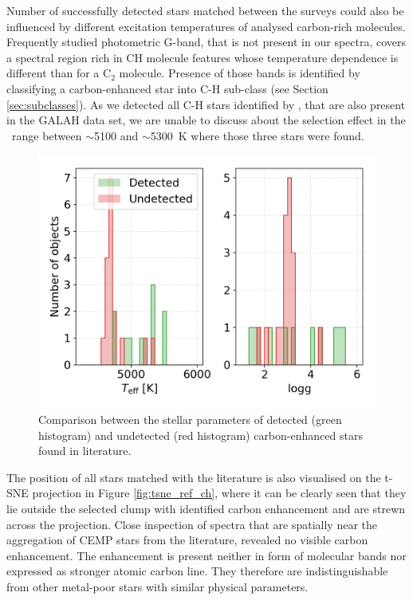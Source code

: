 Number of successfully detected stars matched between the surveys could also be influenced by different excitation temperatures of analysed carbon-rich molecules. Frequently studied photometric G-band, that is not present in our spectra, covers a spectral region rich in CH molecule features whose temperature dependence is different than for a C$_2$ molecule. Presence of those bands is identified by classifying a carbon-enhanced star into C-H sub-class (see Section \ref{sec:subclasses}). As we detected all C-H stars identified by \citet{2016ApJS..226....1J}, that are also present in the GALAH data set, we are unable to discuss about the selection effect in the \Teff\ range between $\sim$5100 and $\sim$5300~K where those three stars were found.

\begin{figure}
	\centering
	\includegraphics[width=\columnwidth]{ch_comb.png}
	\caption{Comparison between the stellar parameters of detected (green histogram) and undetected (red histogram) carbon-enhanced stars found in literature.}
	\label{fig:ch_xmatch}
\end{figure}

The position of all stars matched with the literature is also visualised on the \mbox{t-SNE} projection in Figure \ref{fig:tsne_ref_ch}, where it can be clearly seen that they lie outside the selected clump with identified carbon enhancement and are strewn across the projection. Close inspection of spectra that are spatially near the aggregation of CEMP stars from the literature, revealed no visible carbon enhancement. The enhancement is present neither in form of molecular bands nor expressed as stronger atomic carbon line. They therefore are indistinguishable from other metal-poor stars with similar physical parameters.

